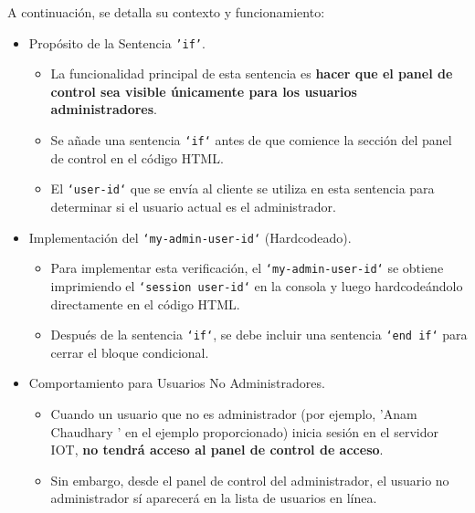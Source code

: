 \documentclass{report}
\begin{document}
A continuación, se detalla su contexto y funcionamiento:
\begin{itemize}
    \item Propósito de la Sentencia \texttt{'if'}.
    \begin{itemize}
        \item La funcionalidad principal de esta sentencia es \textbf{hacer que el panel de control sea visible únicamente para los usuarios administradores}.
        \item Se añade una sentencia \texttt{`if`} antes de que comience la sección del panel de control en el código HTML.
        \item El \texttt{`user-id`} que se envía al cliente se utiliza en esta sentencia para determinar si el usuario actual es el administrador.
    \end{itemize}

    \item Implementación del \texttt{`my-admin-user-id`} (Hardcodeado).
    \begin{itemize}
        \item Para implementar esta verificación, el \texttt{`my-admin-user-id`} se obtiene imprimiendo el \texttt{`session user-id`} en la consola y luego
              hardcodeándolo directamente en el código HTML.
        \item Después de la sentencia \texttt{`if`}, se debe incluir una sentencia \texttt{`end if`} para cerrar el bloque condicional.
    \end{itemize}

    \item Comportamiento para Usuarios No Administradores.
    \begin{itemize}
        \item Cuando un usuario que no es administrador (por ejemplo,  'Anam Chaudhary ' en el ejemplo proporcionado) inicia sesión en el servidor IOT, 
              \textbf{no tendrá acceso al panel de control de acceso}.
        \item Sin embargo, desde el panel de control del administrador, el usuario no administrador sí aparecerá en la lista de usuarios en línea.
    \end{itemize}


\end{itemize}
\end{document}
